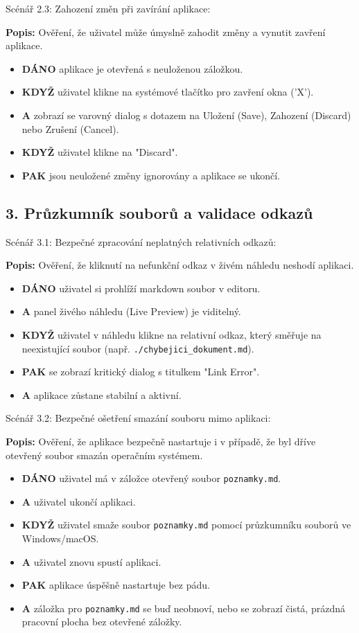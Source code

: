 \documentclass[12pt, a4paper]{article}
\begin{document}
Scénář 2.3: Zahození změn při zavírání aplikace:

\textbf{Popis:} Ověření, že uživatel může úmyslně zahodit změny a vynutit zavření aplikace.
\begin{itemize}
    \item \textbf{DÁNO} aplikace je otevřená s neuloženou záložkou.
    \item \textbf{KDYŽ} uživatel klikne na systémové tlačítko pro zavření okna ('X').
    \item \textbf{A} zobrazí se varovný dialog s dotazem na Uložení (Save), Zahození (Discard) nebo Zrušení (Cancel).
    \item \textbf{KDYŽ} uživatel klikne na "Discard".
    \item \textbf{PAK} jsou neuložené změny ignorovány a aplikace se ukončí.
\end{itemize}

\subsection*{3. Průzkumník souborů a validace odkazů}

Scénář 3.1: Bezpečné zpracování neplatných relativních odkazů:

\textbf{Popis:} Ověření, že kliknutí na nefunkční odkaz v živém náhledu neshodí aplikaci.
\begin{itemize}
    \item \textbf{DÁNO} uživatel si prohlíží markdown soubor v editoru.
    \item \textbf{A} panel živého náhledu (Live Preview) je viditelný.
    \item \textbf{KDYŽ} uživatel v náhledu klikne na relativní odkaz, který směřuje na neexistující soubor (např. \texttt{./chybejici\_dokument.md}).
    \item \textbf{PAK} se zobrazí kritický dialog s titulkem "Link Error".
    \item \textbf{A} aplikace zůstane stabilní a aktivní.
\end{itemize}

Scénář 3.2: Bezpečné ošetření smazání souboru mimo aplikaci:

\textbf{Popis:} Ověření, že aplikace bezpečně nastartuje i v případě, že byl dříve otevřený soubor smazán operačním systémem.
\begin{itemize}
    \item \textbf{DÁNO} uživatel má v záložce otevřený soubor \texttt{poznamky.md}.
    \item \textbf{A} uživatel ukončí aplikaci.
    \item \textbf{KDYŽ} uživatel smaže soubor \texttt{poznamky.md} pomocí průzkumníku souborů ve Windows/macOS.
    \item \textbf{A} uživatel znovu spustí aplikaci.
    \item \textbf{PAK} aplikace úspěšně nastartuje bez pádu.
    \item \textbf{A} záložka pro \texttt{poznamky.md} se buď neobnoví, nebo se zobrazí čistá, prázdná pracovní plocha bez otevřené záložky.
\end{itemize}
\end{document}
